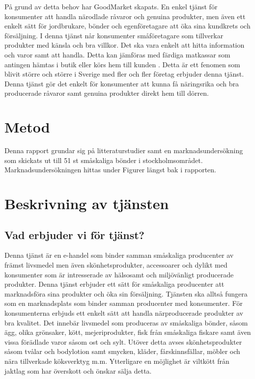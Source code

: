 \documentclass[10pt,a4paper,oneside]{article}
\begin{document}
På grund av detta behov har GoodMarket skapats. En enkel tjänst för konsumenter att handla närodlade råvaror och genuina produkter,  men även ett enkelt sätt för jordbrukare, bönder och egenföretagare att öka sina kundkrets och försäljning. I denna tjänst når konsumenter småföretagare som tillverkar produkter med känsla och bra villkor. Det ska vara enkelt att hitta information och varor samt att handla. Detta kan jämföras med färdiga matkassar som antingen hämtas i butik eller körs hem till kunden \cite{ICA2}. Detta är ett fenomen som blivit större och större i Sverige med fler och fler företag erbjuder denna tjänst. Denna tjänst gör det enkelt för konsumenter att kunna få näringsrika och bra producerade råvaror samt genuina produkter direkt hem till dörren. 

\newpage

\section{Metod}
Denna rapport grundar sig på litteraturstudier samt en marknadsundersökning som skickats ut till 51 st småskaliga bönder i stockholmsområdet. Marknadsundersökningen hittas under Figurer längst bak i rapporten.
\newpage

\section{Beskrivning av tjänsten}
\subsection{Vad erbjuder vi för tjänst?}
Denna tjänst är en e-handel som binder samman småskaliga producenter av främst livsmedel men även skönhetsprodukter, accessoarer och dylikt med konsumenter som är intresserade av hälsosamt och miljövänligt producerade produkter. Denna tjänst erbjuder ett sätt för småskaliga producenter att marknadsföra sina produkter och öka sin försäljning. Tjänsten ska alltså fungera som en marknadsplats som binder samman producenter med konsumenter. För konsumenterna erbjuds ett enkelt sätt att handla närproducerade produkter av bra kvalitet. Det innebär livsmedel som produceras av småskaliga bönder, såsom ägg, olika grönsaker, kött, mejeriprodukter, fisk från småskaliga fiskare samt även vissa förädlade varor såsom ost och sylt. Utöver detta avses skönhetsprodukter såsom tvålar och bodylotion samt smycken, kläder, fårskinnsfällar, möbler och nära tillverkade köksverktyg m.m. Ytterligare en möjlighet är viltkött från jaktlag som har överskott och önskar sälja detta. 
\end{document}
